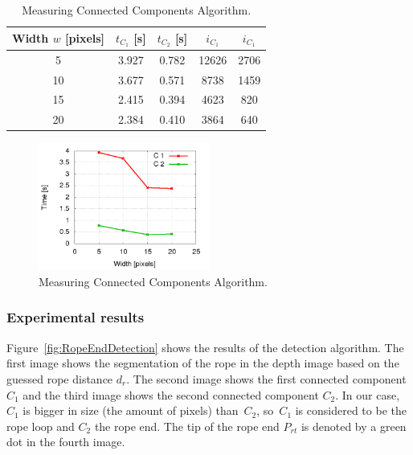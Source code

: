             \begin{table}\centering
            \begin{tabular}{@{}ccccc@{}}\toprule
            Width $w$ [pixels] & $ t_{C_1}$ [s] & $t_{C_2}$ [s] & $i_{C_1}$ & $i_{C_1}$ \\ \midrule
            5 & 3.927 & 0.782 & 12626 & 2706 \\
            10 & 3.677 & 0.571 & 8738 & 1459 \\
            15 & 2.415 & 0.394 & 4623 & 820 \\
            20 & 2.384 & 0.410 & 3864 & 640 \\

            \bottomrule
            \end{tabular}
            \caption{Measuring Connected Components Algorithm.}
            \label{table:MeasuringConnectedComponents}
            \end{table}

            \begin{figure}
            \includegraphics[width=0.5\textwidth]{MeasuringConnectedComponents.png}
            \centering
            \caption{Measuring Connected Components Algorithm.}
            \label{fig:MeasuringConnectedComponents}
            \end{figure}



        \subsubsection{Experimental results}

            Figure~\ref{fig:RopeEndDetection} shows the results of the detection algorithm. The first image shows the segmentation of the rope in the depth image based on the guessed rope distance $d_r$. The second image shows the first connected component $C_1$ and the third image shows the second connected component $C_2$. In our case, $C_1$ is bigger in size (the amount of pixels) than~$C_2$, so~$C_1$ is considered to be the rope loop and $C_2$ the rope end. The tip of the rope end $P_{rt}$ is denoted by a green dot in the fourth image.

